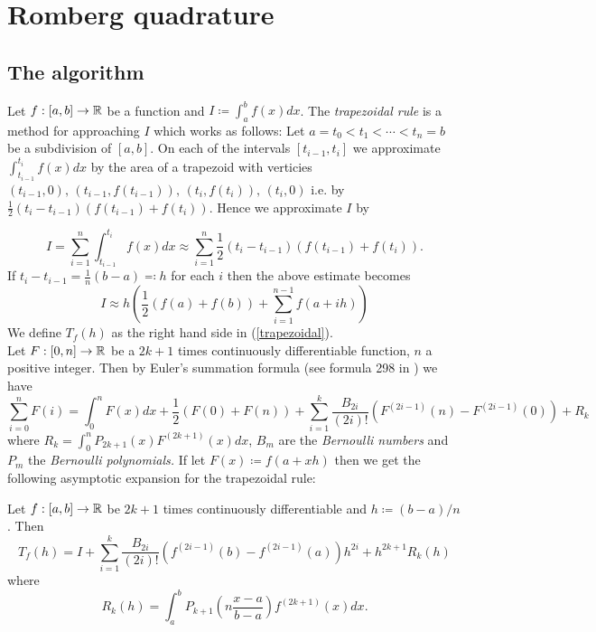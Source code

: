 \chapter{Romberg quadrature}

\section{The algorithm}

Let \(f:[a,b] \rightarrow \mathbb{R}\) be a function and \(I\coloneqq \int_a^bf(x)dx\). The {\it trapezoidal rule} is a method for approaching \(I\) which works as follows: Let \(a = t_0 < t_1 < \cdots < t_n = b\) be a subdivision of \([a,b]\). On each of the intervals \([t_{i-1},t_i]\) we approximate \(\int_{t_{i-1}}^{t_i}f(x)dx\) by the area of a trapezoid with verticies \((t_{i-1},0),\,(t_{i-1}, f(t_{i-1})),\,(t_i,f(t_i)),\, (t_i,0)\) i.e. by \(\frac{1}{2}(t_i - t_{i-1})(f(t_{i-1}) + f(t_i))\). Hence we approximate \(I\) by 

\[
I = \sum_{i=1}^n \int_{t_{i-1}}^{t_i}f(x)dx \approx \sum_{i=1}^n\frac{1}{2}(t_i - t_{i-1})(f(t_{i-1}) + f(t_i)).
\]
If \(t_i - t_{i-1} = \frac{1}{n}(b-a)\eqqcolon h\) for each \(i\) then the above estimate becomes
\begin{equation}\label{trapezoidal}
I \approx h \left(\frac{1}{2}(f(a) + f(b)) + \sum_{i=1}^{n-1}f(a + ih)\right)
\end{equation}
We define \(T_f(h)\) as the right hand side in (\ref{trapezoidal}).\\

Let \(F:[0, n]\rightarrow \mathbb{R}\) be a \(2k+1\) times continuously differentiable function, \(n\) a positive integer. Then by Euler's summation formula (see formula 298 in \cite{kn}) we have
\begin{equation}
\sum_{i=0}^nF(i) = \int_0^nF(x)dx + \frac{1}{2}(F(0) + F(n)) + \sum_{i=1}^k\frac{B_{2i}}{(2i)!}(F^{(2i-1)}(n) - F^{(2i-1)}(0)) + R_k
\end{equation}
where \(R_k = \int_0^nP_{2k+1}(x)F^{(2k+1)}(x)dx\), \(B_m\) are the {\it Bernoulli numbers} and \(P_m\) the {\it Bernoulli polynomials.} If let \(F(x)\coloneqq f(a + xh)\) then we get the following asymptotic expansion for the trapezoidal rule:

\begin{theorem}
Let \(f:[a,b] \rightarrow \mathbb{R}\) be \(2k+1\) times continuously differentiable and \(h \coloneqq (b-a)/n\). Then 
\begin{equation}
T_f(h) = I + \sum_{i=1}^k\frac{B_{2i}}{(2i)!}(f^{(2i-1)}(b) - f^{(2i-1)}(a))h^{2i} + h^{2k+1}R_k(h)
\end{equation}
where
\begin{equation}
R_k(h) = \int_a^bP_{k+1}\left(n\frac{x-a}{b-a}\right)f^{(2k+1)}(x)dx. 
\end{equation}
\end{theorem}

